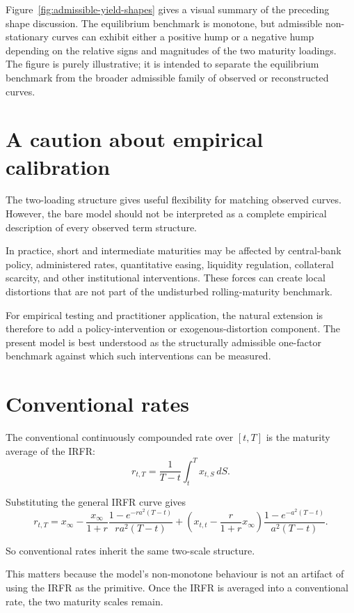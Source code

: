 \documentclass[11pt]{article}
\theoremstyle{plainbreak}
\begin{document}
Figure~\ref{fig:admissible-yield-shapes} gives a visual summary of the preceding shape discussion. The equilibrium benchmark is monotone, but admissible non-stationary curves can exhibit either a positive hump or a negative hump depending on the relative signs and magnitudes of the two maturity loadings. The figure is purely illustrative; it is intended to separate the equilibrium benchmark from the broader admissible family of observed or reconstructed curves.

\section{A caution about empirical calibration}

The two-loading structure gives useful flexibility for matching observed curves. However, the bare model should not be interpreted as a complete empirical description of every observed term structure.

In practice, short and intermediate maturities may be affected by central-bank policy, administered rates, quantitative easing, liquidity regulation, collateral scarcity, and other institutional interventions. These forces can create local distortions that are not part of the undisturbed rolling-maturity benchmark.

For empirical testing and practitioner application, the natural extension is therefore to add a policy-intervention or exogenous-distortion component. The present model is best understood as the structurally admissible one-factor benchmark against which such interventions can be measured.

\section{Conventional rates}

The conventional continuously compounded rate over \([t,T]\) is the maturity average of the IRFR:
\[
r_{t,T}=\frac{1}{T-t}\int_t^T x_{t,S}\,dS.
\]

Substituting the general IRFR curve gives
\[
r_{t,T}
=
x_\infty
-
\frac{x_\infty}{1+r}\frac{1-e^{-ra^2(T-t)}}{ra^2(T-t)}
+
\left(x_{t,t}-\frac{r}{1+r}x_\infty\right)
\frac{1-e^{-a^2(T-t)}}{a^2(T-t)}.
\]

So conventional rates inherit the same two-scale structure.

This matters because the model's non-monotone behaviour is not an artifact of using the IRFR as the primitive. Once the IRFR is averaged into a conventional rate, the two maturity scales remain.
\end{document}
